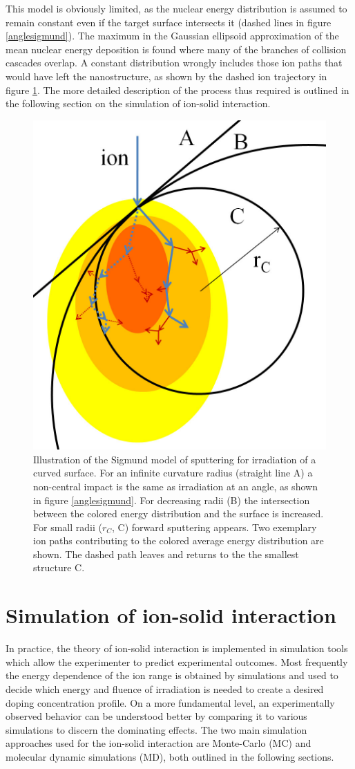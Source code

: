This model is obviously limited, as the nuclear energy distribution is assumed to remain constant even if the target surface intersects it (dashed lines in figure \ref{anglesigmund}). The maximum in the Gaussian ellipsoid approximation of the mean nuclear energy deposition is found where many of the branches of collision cascades overlap. A constant distribution wrongly includes those ion paths that would have left the nanostructure, as shown by the dashed ion trajectory in figure \ref{radiussigmund}. The more detailed description of the process thus required is outlined in the following section on the simulation of ion-solid interaction.

\begin{figure}
	\centering
		\includegraphics[width=.35\textwidth]{images/radiussigmund.jpg}
	\caption{Illustration of the Sigmund model of sputtering for irradiation of a curved surface. For an infinite curvature radius (straight line A) a non-central impact is the same as irradiation at an angle, as shown in figure \ref{anglesigmund}. For decreasing radii (B) the intersection between the colored energy distribution and the surface is increased. For small radii ($r_C$, C) forward sputtering appears. Two exemplary ion paths contributing to the colored average energy distribution are shown. The dashed path leaves and returns to the the smallest structure C.}
	\label{radiussigmund}
\end{figure} 


\section{Simulation of ion-solid interaction}
\label{sec:simion}

In practice, the theory of ion-solid interaction is implemented in simulation tools which allow the experimenter to predict experimental outcomes. Most frequently the energy dependence of the ion range is obtained by simulations and used to decide which energy and fluence of irradiation is needed to create a desired doping concentration profile. On a more fundamental level, an experimentally observed behavior can be understood better by comparing it to various simulations to discern the dominating effects. The two main simulation approaches used for the ion-solid interaction are Monte-Carlo (MC) and molecular dynamic simulations (MD), both outlined in the following sections.



